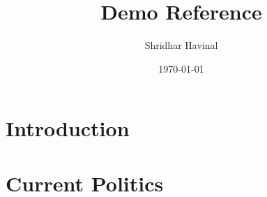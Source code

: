 \documentclass{article}
\title{Demo Reference}
\author{Shridhar Havinal}
\date{\today}
\begin{document}
	\maketitle
	
	\section*{Introduction}
	\lipsum[1]
	
	\section*{Current Politics}
	\lipsum[2]
	
	\nocite{*}
	
	
	
\end{document}
